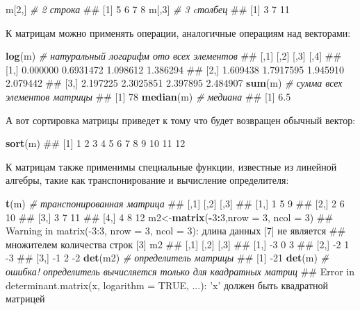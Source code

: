 \documentclass[]{book}
\newenvironment{Shaded}{\begin{snugshade}}{\end{snugshade}}
\newcommand{\KeywordTok}[1]{\textcolor[rgb]{0.13,0.29,0.53}{\textbf{#1}}}
\newcommand{\DataTypeTok}[1]{\textcolor[rgb]{0.13,0.29,0.53}{#1}}
\newcommand{\DecValTok}[1]{\textcolor[rgb]{0.00,0.00,0.81}{#1}}
\newcommand{\CommentTok}[1]{\textcolor[rgb]{0.56,0.35,0.01}{\textit{#1}}}
\newcommand{\OperatorTok}[1]{\textcolor[rgb]{0.81,0.36,0.00}{\textbf{#1}}}
\newcommand{\NormalTok}[1]{#1}
\begin{document}
\begin{Shaded}
\begin{Highlighting}[]
\NormalTok{m[}\DecValTok{2}\NormalTok{,]  }\CommentTok{# 2 строка}
\NormalTok{## [1] 5 6 7 8}
\NormalTok{m[,}\DecValTok{3}\NormalTok{]  }\CommentTok{# 3 cтолбец}
\NormalTok{## [1]  3  7 11}
\end{Highlighting}
\end{Shaded}

К матрицам можно применять операции, аналогичные операциям над
векторами:

\begin{Shaded}
\begin{Highlighting}[]
\KeywordTok{log}\NormalTok{(m)  }\CommentTok{# натуральный логарифм ото всех элементов}
\NormalTok{##          [,1]      [,2]     [,3]     [,4]}
\NormalTok{## [1,] 0.000000 0.6931472 1.098612 1.386294}
\NormalTok{## [2,] 1.609438 1.7917595 1.945910 2.079442}
\NormalTok{## [3,] 2.197225 2.3025851 2.397895 2.484907}
\KeywordTok{sum}\NormalTok{(m)  }\CommentTok{# сумма всех элементов матрицы}
\NormalTok{## [1] 78}
\KeywordTok{median}\NormalTok{(m) }\CommentTok{# медиана}
\NormalTok{## [1] 6.5}
\end{Highlighting}
\end{Shaded}

А вот сортировка матрицы приведет к тому что будет возвращен обычный
вектор:

\begin{Shaded}
\begin{Highlighting}[]
\KeywordTok{sort}\NormalTok{(m)}
\NormalTok{##  [1]  1  2  3  4  5  6  7  8  9 10 11 12}
\end{Highlighting}
\end{Shaded}

К матрицам также применимы специальные функции, известные из линейной
алгебры, такие как транспонирование и вычисление определителя:

\begin{Shaded}
\begin{Highlighting}[]
\KeywordTok{t}\NormalTok{(m)  }\CommentTok{# транспонированная матрица}
\NormalTok{##      [,1] [,2] [,3]}
\NormalTok{## [1,]    1    5    9}
\NormalTok{## [2,]    2    6   10}
\NormalTok{## [3,]    3    7   11}
\NormalTok{## [4,]    4    8   12}
\NormalTok{m2<-}\KeywordTok{matrix}\NormalTok{(}\OperatorTok{-}\DecValTok{3}\OperatorTok{:}\DecValTok{3}\NormalTok{,}\DataTypeTok{nrow =} \DecValTok{3}\NormalTok{, }\DataTypeTok{ncol =} \DecValTok{3}\NormalTok{)}
\NormalTok{## Warning in matrix(-3:3, nrow = 3, ncol = 3): длина данных [7] не является}
\NormalTok{## множителем количества строк [3]}
\NormalTok{m2}
\NormalTok{##      [,1] [,2] [,3]}
\NormalTok{## [1,]   -3    0    3}
\NormalTok{## [2,]   -2    1   -3}
\NormalTok{## [3,]   -1    2   -2}
\KeywordTok{det}\NormalTok{(m2) }\CommentTok{# определитель матрицы}
\NormalTok{## [1] -21}
\KeywordTok{det}\NormalTok{(m)  }\CommentTok{# ошибка! определитель вычисляется только для квадратных матриц}
\NormalTok{## Error in determinant.matrix(x, logarithm = TRUE, ...): 'x' должен быть квадратной матрицей}
\end{Highlighting}
\end{Shaded}
\end{document}
